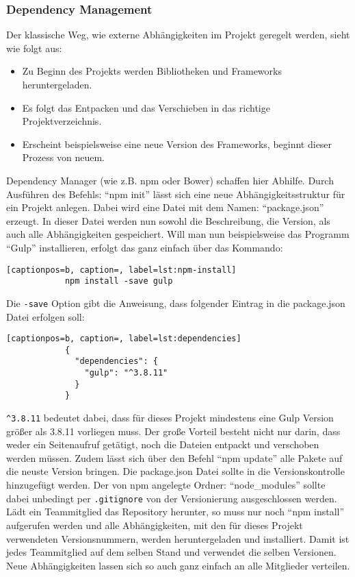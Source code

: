 		\subsubsection{Dependency Management} %
		\label{ssub:dependency_management}
			Der klassische Weg, wie externe Abhängigkeiten im Projekt geregelt werden, sieht wie folgt aus:
			\begin{itemize}
				\item Zu Beginn des Projekts werden Bibliotheken und Frameworks heruntergeladen.
				\item Es folgt das Entpacken und das Verschieben in das richtige Projektverzeichnis.
				\item Erscheint beispielsweise eine neue Version des Frameworks, beginnt dieser Prozess von neuem.
			\end{itemize}

			Dependency Manager (wie z.B. npm oder Bower) schaffen hier Abhilfe. Durch Ausführen des Befehls: "`npm init"' lässt sich eine neue Abhängigkeitsstruktur für ein Projekt anlegen. Dabei wird eine Datei mit dem Namen: "`package.json"' erzeugt. In dieser Datei werden nun sowohl die Beschreibung, die Version, als auch alle Abhängigkeiten gespeichert. Will man nun beispielsweise das Programm "`Gulp"' installieren, erfolgt das ganz einfach über das Kommando:
			\begin{lstlisting}[captionpos=b, caption=, label=lst:npm-install]
			npm install -save gulp
			\end{lstlisting}
				
			Die \texttt{-save} Option gibt die Anweisung, dass folgender Eintrag in die package.json Datei erfolgen soll:

			\begin{lstlisting}[captionpos=b, caption=, label=lst:dependencies]
			{
			  "dependencies": {
			    "gulp": "^3.8.11"
			  }
			}
			\end{lstlisting}

			\texttt{\textasciicircum 3.8.11} bedeutet dabei, dass für dieses Projekt mindestens eine Gulp Version größer als 3.8.11 vorliegen muss. Der große Vorteil besteht nicht nur darin, dass weder ein Seitenaufruf getätigt, noch die Dateien entpackt und verschoben werden müssen. Zudem lässt sich über den Befehl "`npm update"' alle Pakete auf die neuste Version bringen. Die package.json Datei sollte in die Versionskontrolle hinzugefügt werden. Der von npm angelegte Ordner: "`node\_modules"' sollte dabei unbedingt per \texttt{.gitignore} von der Versionierung ausgeschlossen werden. Lädt ein Teammitglied das Repository herunter, so muss nur noch "`npm install"' aufgerufen werden und alle Abhängigkeiten, mit den für dieses Projekt verwendeten Versionsnummern, werden heruntergeladen und installiert. Damit ist jedes Teammitglied auf dem selben Stand und verwendet die selben Versionen. Neue Abhängigkeiten lassen sich so auch ganz einfach an alle Mitglieder verteilen.
			
